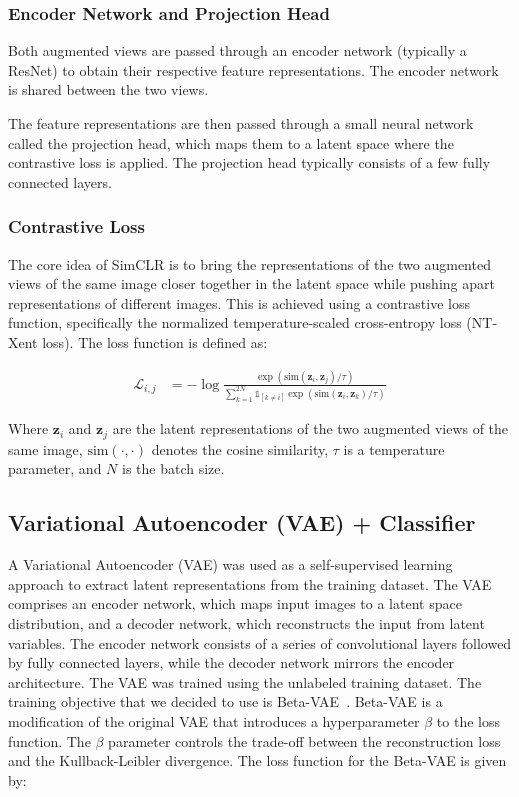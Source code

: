 \documentclass{article}
\begin{document}
\subsubsection{Encoder Network and Projection Head}
Both augmented views are passed through an encoder network (typically a ResNet)
to obtain their respective feature representations. The encoder network is
shared between the two views.

The feature representations are then passed through a small neural network
called the projection head, which maps them to a latent space where the
contrastive loss is applied. The projection head typically consists of a few
fully connected layers.

\subsubsection{Contrastive Loss}
The core idea of SimCLR is to bring the representations of the two augmented
views of the same image closer together in the latent space while pushing apart
representations of different images. This is achieved using a contrastive loss
function, specifically the normalized temperature-scaled cross-entropy loss
(NT-Xent loss). The loss function is defined as:

\begin{align}
  \mathcal{L}_{i,j} & = -\log
  \frac{\exp(\text{sim}(\mathbf{z}_i, \mathbf{z}_j) / \tau)}{\sum_{k=1}^{2N}
  \mathbb{1}_{[k \neq i]} \exp(\text{sim}(\mathbf{z}_i, \mathbf{z}_k) / \tau)}
  \label{eq:simclr}
\end{align}

Where $\mathbf{z}_i$ and $\mathbf{z}_j$ are the latent representations of the
two augmented views of the same image, $\text{sim}(\cdot, \cdot)$ denotes the
cosine similarity, $\tau$ is a temperature parameter, and $N$ is the batch
size.

\subsection{Variational Autoencoder (VAE) + Classifier}

A Variational Autoencoder (VAE) was used as a self-supervised learning
approach to extract latent representations from the training dataset. The VAE
comprises an encoder network, which maps input images to a latent space
distribution, and a decoder network, which reconstructs the input from latent
variables. The encoder network consists of a series of convolutional layers
followed by fully connected layers, while the decoder network mirrors the
encoder architecture. The VAE was trained using the unlabeled training dataset.
The training objective that we decided to use is Beta-VAE~\cite{beta-vae}.
Beta-VAE is a modification of the original VAE that introduces a hyperparameter
$\beta$ to the loss function. The $\beta$ parameter controls the trade-off
between the reconstruction loss and the Kullback-Leibler divergence. The loss
function for the Beta-VAE is given by:
\end{document}
